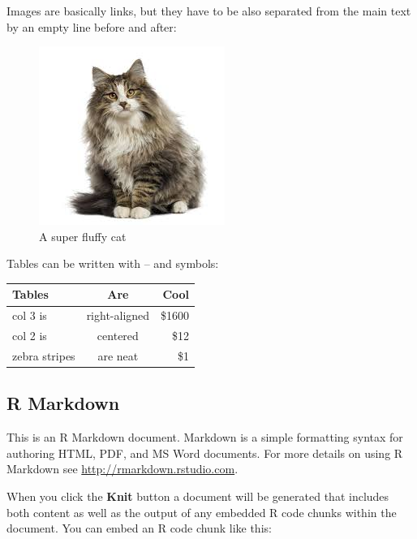 \documentclass[a4paper]{article}
\begin{document}
  Images are basically links, but they have to be also separated from the
  main text by an empty line before and after:
  
  \begin{figure}[htbp]
  \centering
  \includegraphics{images/fluffycat.jpg}
  \caption{A super fluffy cat}
  \end{figure}
  
  
  Tables can be written with -- and \textbar{}\textbar{} symbols:
  
  \begin{longtable}[]{@{}lcr@{}}
  \toprule
  Tables & Are & Cool\tabularnewline
  \midrule
  \endhead
  col 3 is & right-aligned & \$1600\tabularnewline
  col 2 is & centered & \$12\tabularnewline
  zebra stripes & are neat & \$1\tabularnewline
  \bottomrule
  \end{longtable}
  
 
 \subsection{R Markdown}\label{r-markdown}
 
 This is an R Markdown document. Markdown is a simple formatting syntax
 for authoring HTML, PDF, and MS Word documents. For more details on
 using R Markdown see \url{http://rmarkdown.rstudio.com}.
 
 When you click the \textbf{Knit} button a document will be generated
 that includes both content as well as the output of any embedded R code
 chunks within the document. You can embed an R code chunk like this:
  
    
\end{document}
